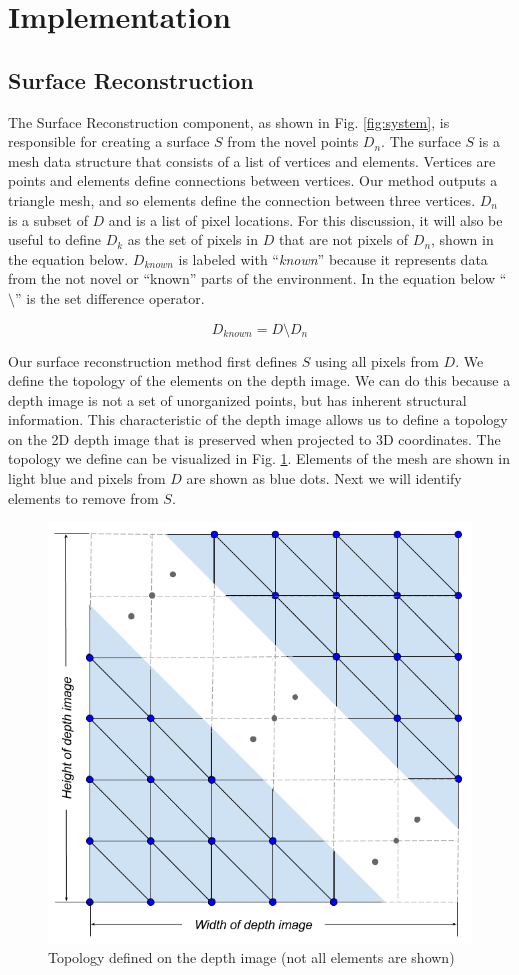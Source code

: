 \section{Implementation}

\subsection{Surface Reconstruction}
\label{subsection:surface_reconstruction}

The Surface Reconstruction component, as shown in Fig. \ref{fig:system}, is
responsible for creating a surface $S$ from the novel points $D_n$. The surface
$S$ is a mesh data structure that consists of a list of vertices and elements.
Vertices are points and elements define connections between vertices. Our method
outputs a triangle mesh, and so elements define the connection between three
vertices. $D_n$ is a subset of $D$ and is a list of pixel locations. For this
discussion, it will also be useful to define $D_k$ as the set of pixels in $D$
that are not pixels of $D_n$, shown in the equation below. $D_{known}$ is
labeled with ``\emph{known}'' because it represents data from the not novel or
``known'' parts of the environment. In the equation below ``$\setminus$'' is the
set difference operator.

\begin{equation}
D_{known} = D \setminus D_n
\end{equation}

Our surface reconstruction method first defines $S$ using all pixels from $D$.
We define the topology of the elements on the depth image. We can do this
because a depth image is not a set of unorganized points, but has inherent
structural information. This characteristic of the depth image allows us to
define a topology on the 2D depth image that is preserved when projected to 3D
coordinates. The topology we define can be visualized in Fig. \ref{fig:sr_t}.
Elements of the mesh are shown in light blue and pixels from $D$ are shown as
blue dots. Next we will identify elements to remove from $S$.

\begin{figure}[h]%
\centering
  \includegraphics[width=.70\textwidth]{figures/diagram_sr_topology.png}
  \caption{Topology defined on the depth image (not all elements are shown)}
  \label{fig:sr_t}
\end{figure}

